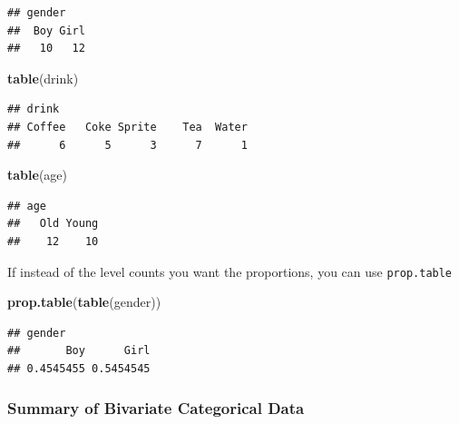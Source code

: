 \documentclass[]{book}
\newenvironment{Shaded}{\begin{snugshade}}{\end{snugshade}}
\newcommand{\CommentTok}[1]{\textcolor[rgb]{0.56,0.35,0.01}{\textit{#1}}}
\newcommand{\KeywordTok}[1]{\textcolor[rgb]{0.13,0.29,0.53}{\textbf{#1}}}
\newcommand{\NormalTok}[1]{#1}
\newcommand{\OperatorTok}[1]{\textcolor[rgb]{0.81,0.36,0.00}{\textbf{#1}}}
\newcommand{\StringTok}[1]{\textcolor[rgb]{0.31,0.60,0.02}{#1}}
\theoremstyle{definition}
\theoremstyle{definition}
\theoremstyle{definition}
\theoremstyle{remark}
\begin{document}
\begin{verbatim}
## gender
##  Boy Girl 
##   10   12
\end{verbatim}

\begin{Shaded}
\begin{Highlighting}[]
\KeywordTok{table}\NormalTok{(drink)}
\end{Highlighting}
\end{Shaded}

\begin{verbatim}
## drink
## Coffee   Coke Sprite    Tea  Water 
##      6      5      3      7      1
\end{verbatim}

\begin{Shaded}
\begin{Highlighting}[]
\KeywordTok{table}\NormalTok{(age)}
\end{Highlighting}
\end{Shaded}

\begin{verbatim}
## age
##   Old Young 
##    12    10
\end{verbatim}

If instead of the level counts you want the proportions, you can use \texttt{prop.table}

\begin{Shaded}
\begin{Highlighting}[]
\KeywordTok{prop.table}\NormalTok{(}\KeywordTok{table}\NormalTok{(gender))}
\end{Highlighting}
\end{Shaded}

\begin{verbatim}
## gender
##       Boy      Girl 
## 0.4545455 0.5454545
\end{verbatim}

\hypertarget{summary-of-bivariate-categorical-data}{%
\subsubsection{Summary of Bivariate Categorical Data}\label{summary-of-bivariate-categorical-data}}

\begin{Shaded}
\end{Shaded}
\end{document}

